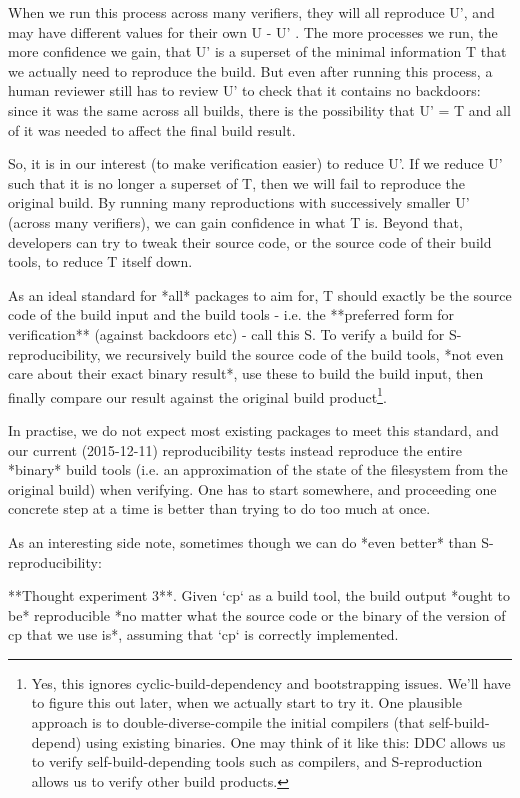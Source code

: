 When we run this process across many verifiers, they will all reproduce U', and
may have different values for { their own U - U' }. The more processes we run,
the more confidence we gain, that U' is a superset of the minimal information T
that we actually need to reproduce the build. But even after running this
process, a human reviewer still has to review U' to check that it contains no
backdoors: since it was the same across all builds, there is the possibility
that U' = T and all of it was needed to affect the final build result.

So, it is in our interest (to make verification easier) to reduce U'. If we
reduce U' such that it is no longer a superset of T, then we will fail to
reproduce the original build. By running many reproductions with successively
smaller U' (across many verifiers), we can gain confidence in what T is. Beyond
that, developers can try to tweak their source code, or the source code of
their build tools, to reduce T itself down.

As an ideal standard for *all* packages to aim for, T should exactly be the
source code of the build input and the build tools - i.e. the **preferred form
for verification** (against backdoors etc) - call this S. To verify a build for
S-reproducibility, we recursively build the source code of the build tools,
*not even care about their exact binary result*, use these to build the build
input, then finally compare our result against the original build 
product\footnote{Yes, this ignores cyclic-build-dependency and bootstrapping 
issues.  We'll have to figure this out later, when we actually start to try it.
One plausible approach is to double-diverse-compile the initial compilers (that
self-build-depend) using existing binaries. One may think of it like this:
DDC allows us to verify self-build-depending tools such as compilers, and
S-reproduction allows us to verify other build products.}. 

In practise, we do not expect most existing packages to meet this standard, and
our current (2015-12-11) reproducibility tests instead reproduce the entire
*binary* build tools (i.e. an approximation of the state of the filesystem from
the original build) when verifying. One has to start somewhere, and proceeding
one concrete step at a time is better than trying to do too much at once.

As an interesting side note, sometimes though we can do *even better* than
S-reproducibility:

**Thought experiment 3**. Given `cp` as a build tool, the build output *ought
to be* reproducible *no matter what the source code or the binary of the
version of cp that we use is*, assuming that `cp` is correctly implemented.

